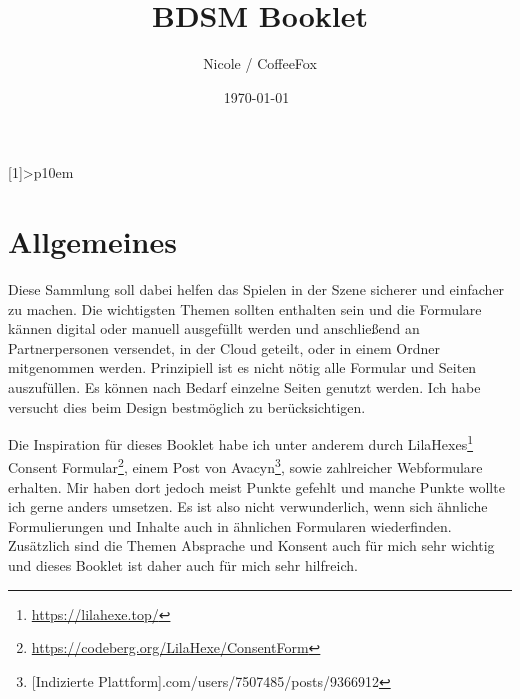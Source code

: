 \documentclass[a4paper,12pt]{article}
\begin{document}
\setlength\dashlinedash{0.2pt}
\setlength\dashlinegap{1.5pt}
\setlength\arrayrulewidth{0.3pt}
\newcolumntype{P}[1]{>{\centering\arraybackslash}p{10em}}


\title{BDSM Booklet}
\author{Nicole / CoffeeFox}
\date{\today \ \currenttime \bigbreak {}}
\renewcommand*\contentsname{Inhaltsverzeichnis}

\pagestyle{fancy}
\fancyhead{} %
\fancyfoot{} %
\fancyfoot[LE,RO]{\thepage}


\maketitle
\tableofcontents
\newpage


\section{Allgemeines}
Diese Sammlung soll dabei helfen das Spielen in der Szene sicherer und einfacher zu machen. Die wichtigsten Themen sollten enthalten sein und die Formulare kännen digital oder manuell ausgefüllt werden und anschließend an Partnerpersonen versendet, in der Cloud geteilt, oder in einem Ordner mitgenommen werden. Prinzipiell ist es nicht nötig alle Formular und Seiten auszufüllen. Es können nach Bedarf einzelne Seiten genutzt werden. Ich habe versucht dies beim Design bestmöglich zu berücksichtigen.\bigbreak

Die Inspiration für dieses Booklet habe ich unter anderem durch LilaHexes\footnote{\url{https://lilahexe.top/}} \glqq Consent Formular\grqq \footnote{\url{https://codeberg.org/LilaHexe/ConsentForm}}, einem Post von Avacyn\footnote{[Indizierte Plattform].com/users/7507485/posts/9366912}, sowie zahlreicher Webformulare erhalten. Mir haben dort jedoch meist Punkte gefehlt und manche Punkte wollte ich gerne anders umsetzen. Es ist also nicht verwunderlich, wenn sich ähnliche Formulierungen und Inhalte auch in ähnlichen Formularen wiederfinden. Zusätzlich sind die Themen Absprache und Konsent auch für mich sehr wichtig und dieses Booklet ist daher auch für mich sehr hilfreich. \bigbreak
\end{document}
